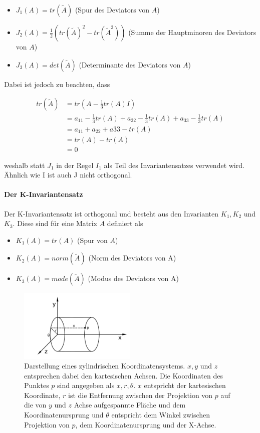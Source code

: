 \documentclass[a4paper,fontsize=12pt,toc=bib,halfparskip]{scrartcl}
\begin{document}
\begin{itemize}
	\item $J_1(A) = tr(\tilde{A})$ (Spur des Deviators von $A$)
	\item $J_2(A) = \frac{1}{2}(tr(\tilde{A})^2 - tr(\tilde{A}^2))$ (Summe der Hauptminoren des Deviators von $A$)
\item $J_3(A) = det(\tilde{A})$ (Determinante des Deviators von $A$)
\end{itemize}

Dabei ist jedoch zu beachten, dass

\begin{equation}
	\begin{split}
	tr(\tilde{A}) &= tr(A - \frac{1}{3}tr(A)I)\\
	&= a_{11} - \frac{1}{3} tr(A) + a_{22} - \frac{1}{3} tr(A) + a_{33} - \frac{1}{3} tr(A)\\
	&= a_{11} + a_{22} + a{33} - tr(A)\\
	&= tr(A) - tr(A)\\
	&= 0
	\end{split}
\end{equation}

weshalb statt $J_1$ in der Regel $I_1$ als Teil des Invariantensatzes verwendet wird. \"Ahnlich wie I ist auch J nicht orthogonal.

\paragraph{Der K-Invariantensatz}
Der K-Invariantensatz ist orthogonal und besteht aus den Invarianten $K_1, K_2$ und $K_3$. Diese sind f\"ur eine Matrix $A$ definiert als

\begin{itemize}
	\item $K_1(A)=tr(A)$ (Spur von $A$)
	\item $K_2(A)=norm(\tilde{A})$ (Norm des Deviators von A)
	\item $K_3(A)=mode(\tilde{A})$ (Modus des Deviators von A)
\end{itemize}


\begin{figure}
	\centering
	\includegraphics[width=0.5\textwidth]{pictures/cylinder}
	\caption{Darstellung eines zylindrischen Koordinatensystems. $x,y$ und $z$ entsprechen dabei den kartesischen Achsen. Die Koordinaten des Punktes $p$ sind angegeben als $x, r, \theta$. $x$ entspricht der kartesischen Koordinate, $r$ ist die Entfernung zwischen der Projektion von $p$ auf die von $y$ und $z$ Achse aufgespannte Fl\"ache und dem Koordinatenursprung und $\theta$ entspricht dem Winkel zwischen Projektion von $p$, dem Koordinatenursprung und der X-Achse. }
	\label{cylinderCoords}
\end{figure}
\end{document}
